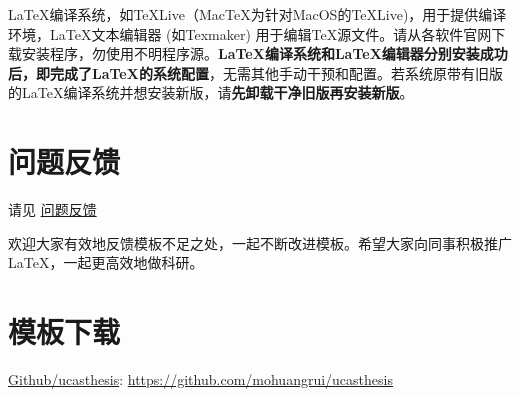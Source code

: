 \LaTeX{}编译系统，如\TeX{}Live（Mac\TeX{}为针对MacOS的\TeX{}Live)，用于提供编译环境，\LaTeX{}文本编辑器 (如Texmaker) 用于编辑\TeX{}源文件。请从各软件官网下载安装程序，勿使用不明程序源。\textbf{\LaTeX{}编译系统和\LaTeX{}编辑器分别安装成功后，即完成了\LaTeX{}的系统配置}，无需其他手动干预和配置。若系统原带有旧版的\LaTeX{}编译系统并想安装新版，请\textbf{先卸载干净旧版再安装新版}。

\section*{问题反馈}

请见 \href{https://github.com/mohuangrui/ucasthesis/wiki/%E5%B8%B8%E8%A7%81%E9%97%AE%E9%A2%98}{问题反馈} 

欢迎大家有效地反馈模板不足之处，一起不断改进模板。希望大家向同事积极推广\LaTeX{}，一起更高效地做科研。

\section*{模板下载}

\begin{center}
	\href{https://github.com/mohuangrui/ucasthesis}{Github/ucasthesis}: \url{https://github.com/mohuangrui/ucasthesis}
\end{center}
